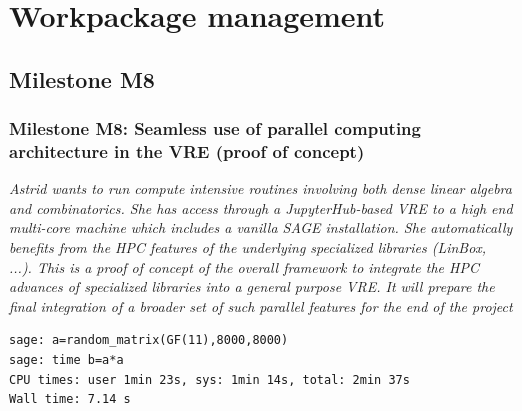 \documentclass{beamer}
\begin{document}
    


\section{Workpackage management}

\subsection{Milestone M8}
\begin{frame}[fragile]
  \frametitle{Milestone M8: Seamless use of parallel computing architecture in the VRE (proof of concept)}

{\footnotesize  \textit{Astrid wants to run compute intensive routines involving both dense linear algebra and combinatorics. She has access through a JupyterHub-based VRE to a high end multi-core machine which includes a vanilla SAGE installation.
She automatically benefits from the HPC features of the underlying specialized libraries (LinBox, ...). This is a proof of concept of the overall framework to integrate the HPC advances of specialized libraries into a general purpose VRE. It will prepare the final integration of a broader set of such parallel features for the end of the project}


\begin{verbatim}
sage: a=random_matrix(GF(11),8000,8000)
sage: time b=a*a
CPU times: user 1min 23s, sys: 1min 14s, total: 2min 37s
Wall time: 7.14 s
\end{verbatim}
}

\end{frame}
\end{document}
